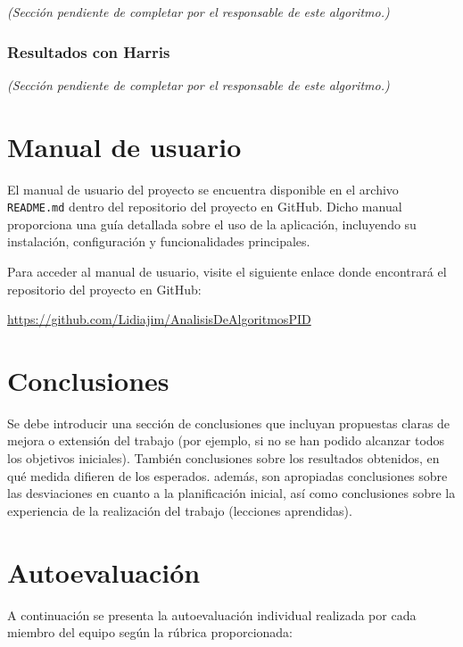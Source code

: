 \documentclass[a4paper]{article}
\begin{document}
\textit{(Sección pendiente de completar por el responsable de este algoritmo.)}

\vspace{0.5cm}
\subsubsection*{Resultados con Harris}

\textit{(Sección pendiente de completar por el responsable de este algoritmo.)}
\newpage

\section{Manual de usuario}

El manual de usuario del proyecto se encuentra disponible en el archivo \texttt{README.md} dentro del repositorio del proyecto en GitHub. Dicho manual proporciona una guía detallada sobre el uso de la aplicación, incluyendo su instalación, configuración y funcionalidades principales.
\par\hspace{1cm}

Para acceder al manual de usuario, visite el siguiente enlace donde encontrará el repositorio del proyecto en GitHub:

\begin{center}
\url{https://github.com/Lidiajim/AnalisisDeAlgoritmosPID}
\end{center}
\newpage

\section{Conclusiones}

Se debe introducir una sección de conclusiones que incluyan propuestas claras de mejora o extensión del trabajo (por ejemplo, si no se han podido alcanzar todos los objetivos iniciales). También conclusiones sobre los resultados obtenidos, en qué medida difieren de los esperados. además, son apropiadas conclusiones sobre las desviaciones en cuanto a la planificación inicial, así como conclusiones sobre la experiencia de la realización del trabajo (lecciones aprendidas).
\newpage
\section{Autoevaluación}
A continuación se presenta la autoevaluación individual realizada por cada miembro del equipo según la rúbrica proporcionada:
\end{document}
